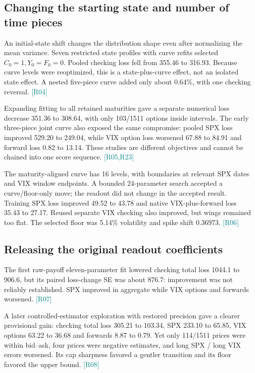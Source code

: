 \documentclass[11pt,a4paper]{article}
\newcommand{\src}[1]{\textcolor{teal}{\small[#1]}}
\begin{document}
\subsection{Changing the starting state and number of time pieces}
An initial-state shift changes the distribution shape even after normalizing the mean variance. Seven restricted state profiles with curve refits selected $C_0=1,Y_0=F_0=0$. Pooled checking loss fell from 355.46 to 316.93. Because curve levels were reoptimized, this is a state-plus-curve effect, not an isolated state effect. A nested five-piece curve added only about 0.64\%, with one checking reversal. \src{R04}

Expanding fitting to all retained maturities gave a separate numerical loss decrease 351.36 to 308.64, with only 103/1511 options inside intervals. The early three-piece joint curve also exposed the same compromise: pooled SPX loss improved 529.20 to 249.04, while VIX option loss worsened 67.88 to 84.91 and forward loss 0.82 to 13.14. These studies are different objectives and cannot be chained into one score sequence. \src{R05,R23}

The maturity-aligned curve has 16 levels, with boundaries at relevant SPX dates and VIX window endpoints. A bounded 24-parameter search accepted a curve/floor-only move; the readout did not change in the accepted result. Training SPX loss improved 49.52 to 43.78 and native VIX-plus-forward loss 35.43 to 27.17. Reused separate VIX checking also improved, but wings remained too flat. The selected floor was 5.14\% volatility and spike shift 0.36973. \src{R06}

\subsection{Releasing the original readout coefficients}
The first raw-payoff eleven-parameter fit lowered checking total loss 1044.1 to 906.6, but its paired loss-change SE was about 876.7: improvement was not reliably established. SPX improved in aggregate while VIX options and forwards worsened. \src{R07}

A later controlled-estimator exploration with restored precision gave a clearer provisional gain: checking total loss 305.21 to 103.34, SPX 233.10 to 65.85, VIX options 63.22 to 36.68 and forwards 8.87 to 0.79. Yet only 114/1511 prices were within bid--ask, four prices were negative estimates, and long SPX / long VIX errors worsened. Its cap sharpness favored a gentler transition and its floor favored the upper bound. \src{R08}
\end{document}
